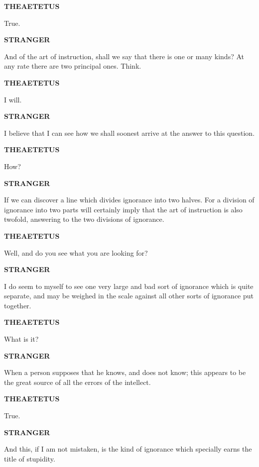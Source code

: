 \documentclass[11pt,letter]{article}
\begin{document}
\par \textbf{THEAETETUS}
\par   True.

\par \textbf{STRANGER}
\par   And of the art of instruction, shall we say that there is one or many kinds? At any rate there are two principal ones. Think.

\par \textbf{THEAETETUS}
\par   I will.

\par \textbf{STRANGER}
\par   I believe that I can see how we shall soonest arrive at the answer to this question.

\par \textbf{THEAETETUS}
\par   How?

\par \textbf{STRANGER}
\par   If we can discover a line which divides ignorance into two halves. For a division of ignorance into two parts will certainly imply that the art of instruction is also twofold, answering to the two divisions of ignorance.

\par \textbf{THEAETETUS}
\par   Well, and do you see what you are looking for?

\par \textbf{STRANGER}
\par   I do seem to myself to see one very large and bad sort of ignorance which is quite separate, and may be weighed in the scale against all other sorts of ignorance put together.

\par \textbf{THEAETETUS}
\par   What is it?

\par \textbf{STRANGER}
\par   When a person supposes that he knows, and does not know; this appears to be the great source of all the errors of the intellect.

\par \textbf{THEAETETUS}
\par   True.

\par \textbf{STRANGER}
\par   And this, if I am not mistaken, is the kind of ignorance which specially earns the title of stupidity.
\end{document}

